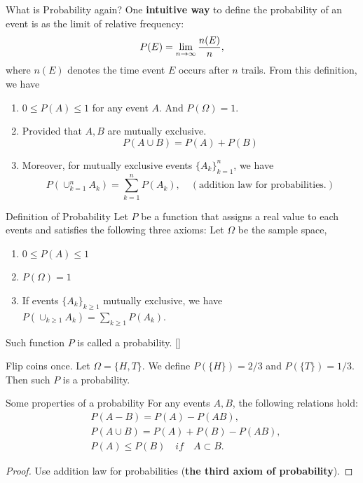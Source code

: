 \begin{frame}{What is Probability again?}
	One \textbf{intuitive way} to define the probability of an event is as the limit of relative frequency:
	\begin{align}
		P(E)=\lim_{n\rightarrow \infty}\frac{n(E)}{n},
	\end{align}
where $n(E)$ denotes the time  event $E$ occurs after $n$ trails. From this definition, we have
\begin{enumerate}
	\item $0\leq P(A)\leq 1$ for any event $A$. And $P(\Omega)=1$.
	\item 	Provided that $A,B$ are mutually exclusive.
	\[P(A\cup B)=P(A)+P(B)\]
	\item Moreover, for mutually exclusive events $\{A_k\}_{k=1}^n$, we have
	\[P(\cup_{k=1}^n A_k)=\sum_{k=1}^nP(A_k),\quad (\text{addition law for probabilities.})\]

\end{enumerate}
\end{frame}
\begin{frame}{Definition of Probability}
	\bd
	Let $P$ be a function that assigns a real value to each events and satisfies the following three axioms: Let $\Omega$ be the sample space,
	\begin{enumerate}
		\item $0\leq P(A)\leq 1$
		\item $P(\Omega)=1$
		\item If events $\{A_k\}_{k\geq 1}$ mutually exclusive, we have
		$
			P(\cup_{k\geq 1}A_k)=\sum_{k\geq 1} P(A_k).
	$
	\end{enumerate}
Such function $P$ is called a probability. []
	\ed
	\begin{example}
		Flip coins once. Let $\Omega=\{H,T\}$. We define $P(\{H\})=2/3$ and $P(\{T\})=1/3$. Then such $P$ is a probability.\pause {}
	\end{example}	
\end{frame}

\begin{frame}{Some properties of a probability}
	\bt
	For any events $A,B$, the following relations hold:
	\begin{align}
		& P(A-B)=P(A)-P(AB),\\
		& P(A\cup B)=P(A)+P(B)-P(AB),\\
		& P(A)\leq P(B) \quad if\quad A\subset B.
	\end{align}
	\et
	\begin{proof}
		Use addition law for probabilities (\textbf{the third axiom of probability}).
	\end{proof}
\end{frame}

